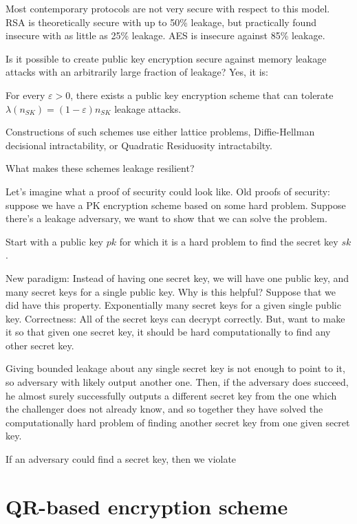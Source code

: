 \documentclass[10pt]{article}
\begin{document}
Most contemporary protocols are not very secure with respect to this model. RSA is theoretically secure with up to 50\% leakage, but practically found insecure with as little as 25\% leakage. AES is insecure against 85\% leakage.

Is it possible to create public key encryption secure against memory leakage attacks with an arbitrarily large fraction of leakage? Yes, it is:

\begin{theorem}
For every $\varepsilon > 0$, there exists a public key encryption scheme that can tolerate $\lambda(n_{SK}) = (1 - \varepsilon)n_{SK}$ leakage attacks.
\end{theorem}
Constructions of such schemes use either lattice problems, Diffie-Hellman decisional intractability, or Quadratic Residuosity intractabilty.

What makes these schemes leakage resilient?

Let's imagine what a proof of security could look like. Old proofs of security: suppose we have a PK encryption scheme based on some hard problem. Suppose there's a leakage adversary, we want to show that we can solve the problem.

Start with a public key $pk$ for which it is a hard problem to find the secret key $sk$.

New paradigm: Instead of having one secret key, we will have one public key, and many secret keys for a single public key. Why is this helpful? Suppose that we did have this property. Exponentially many secret keys for a given single public key. Correctness: All of the secret keys can decrypt correctly. But, want to make it so that given one secret key, it should be hard computationally to find any other secret key.

Giving bounded leakage about any single secret key is not enough to point to it, so adversary with likely output another one. Then, if the adversary does succeed, he almost surely successfully outputs a different secret key from the one which the challenger does not already know, and so together they have solved the computationally hard problem of finding another secret key from one given secret key.

If an adversary could find a secret key, then we violate

\section{QR-based encryption scheme}
\end{document}
